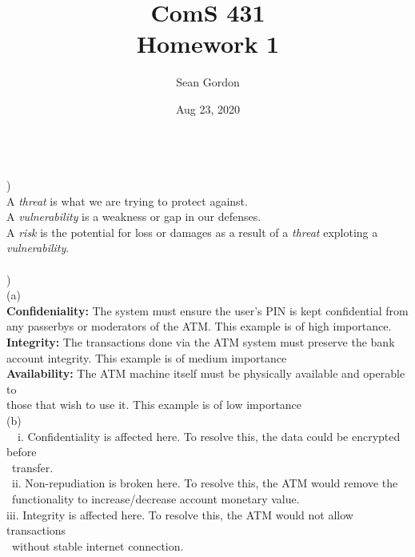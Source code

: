 \documentclass[12pt]{article}
\title{ComS 431\\Homework 1}
\author{Sean Gordon}
\date{Aug 23, 2020}
\begin{document}
\maketitle


\noindent\hrulefill \\


)\\
\indent A \textit{threat} is what we are trying to protect against.\\
\indent A \textit{vulnerability} is a weakness or gap in our defenses.\\
\indent A \textit{risk} is the potential for loss or damages as a result of a \textit{threat} exploting a \textit{vulnerability}.\\


\noindent \hrulefill \\


)\\
\indent (a)\\
\indent \textbf{Confideniality:} The system must ensure the user's PIN is kept confidential from\\
\indent\indent any passerbys or moderators of the ATM. This example is of high importance.\\
\indent \textbf{Integrity:} The transactions done via the ATM system must preserve the bank\\
\indent\indent account integrity. This example is of medium importance\\
\indent \textbf{Availability:} The ATM machine itself must be physically available and operable to \\
\indent\indent those that wish to use it. This example is of low importance\\

\indent (b)\\
\indent \ \ i. Confidentiality is affected here. To resolve this, the data could be encrypted before\\
\indent \indent\ transfer.\\
\indent \ ii. Non-repudiation is broken here. To resolve this, the ATM would remove the\\
\indent \indent\ functionality to increase/decrease account monetary value.\\
\indent iii. Integrity is affected here. To resolve this, the ATM would not allow transactions\\
\indent \indent\ without stable internet connection.\\
\end{document}
